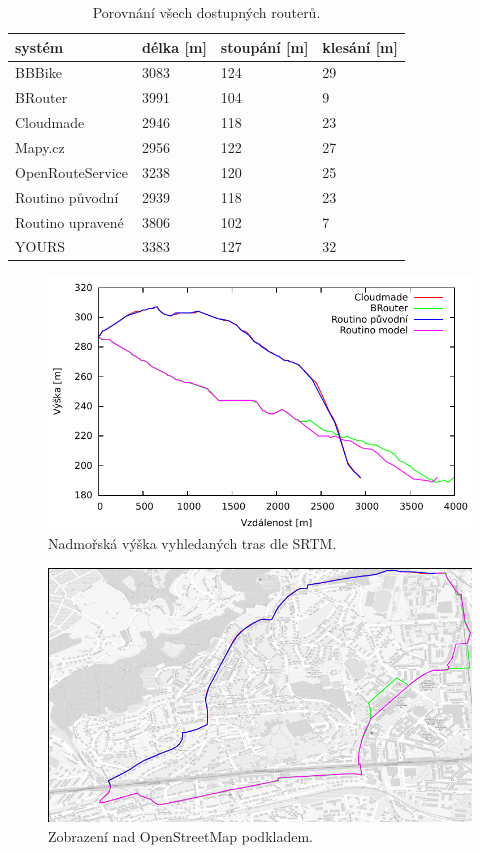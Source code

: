 \documentclass[thesis=B,czech]{FITthesis}[2012/06/26]
\begin{document}
\begin{table}[h!]
\begin{tabular}{l|l|l|l} %
\textbf{systém}	&	\textbf{délka [m]}	&	\textbf{stoupání [m]}	&	\textbf{klesání [m]}	\\
\hline
BBBike	&	3083 & 124	&	29	 \\
BRouter	&	3991 & 104	&	9	 \\
Cloudmade	&	2946 & 118	&	23	 \\
Mapy.cz	&	2956 & 122	&	27	 \\
OpenRouteService	&	3238 & 120	&	25	 \\
Routino původní	&	2939 & 118	&	23	 \\
Routino upravené	&	3806 & 102	&	7	 \\
YOURS	&	3383 & 127	&	32	 \\
\end{tabular}
\caption{Porovnání všech dostupných routerů.}
\label{table:h}
\end{table}

\begin{figure}[!ht]
\centering
\includegraphics[width=\columnwidth]{porovnani/ele-2h-z.pdf}
\caption{Nadmořská výška vyhledaných tras dle SRTM. }
\label{img:vyska-h}
\end{figure}

\begin{figure}[!ht]
\centering
\includegraphics[width=\columnwidth]{porovnani/ll-2h-z.pdf}
\caption{Zobrazení nad OpenStreetMap podkladem. }
\label{img:mapa-h}
\end{figure}
\end{document}
